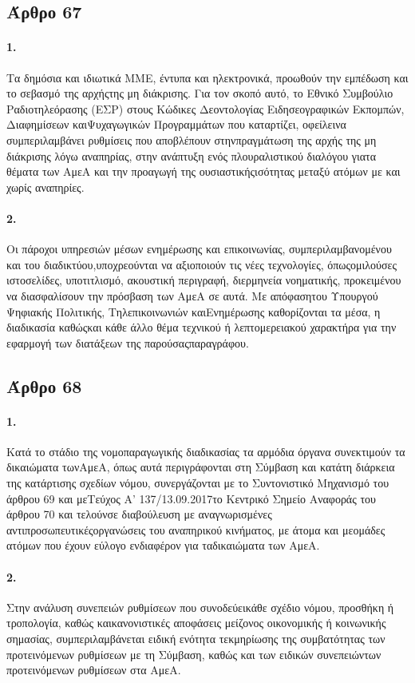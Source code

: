 \documentclass[a4paper,oneside, 10pt]{book}
\begin{document}
\subsection*{ Άρθρο 67 }
\paragraph { 1. } Τα δημόσια και ιδιωτικά ΜΜΕ, έντυπα και ηλεκτρονικά, προωθούν την εμπέδωση και το σεβασμό της αρχήςτης μη διάκρισης. Για τον σκοπό αυτό, το Εθνικό Συμβούλιο Ραδιοτηλεόρασης (ΕΣΡ) στους Κώδικες Δεοντολογίας Ειδησεογραφικών Εκπομπών, Διαφημίσεων καιΨυχαγωγικών Προγραμμάτων που καταρτίζει, οφείλεινα συμπεριλαμβάνει ρυθμίσεις που αποβλέπουν στηνπραγμάτωση της αρχής της μη διάκρισης λόγω αναπηρίας, στην ανάπτυξη ενός πλουραλιστικού διαλόγου γιατα θέματα των ΑμεΑ και την προαγωγή της ουσιαστικήςισότητας μεταξύ ατόμων με και χωρίς αναπηρίες.
\paragraph { 2. } Οι πάροχοι υπηρεσιών μέσων ενημέρωσης και επικοινωνίας, συμπεριλαμβανομένου και του διαδικτύου,υποχρεούνται να αξιοποιούν τις νέες τεχνολογίες, όπωςομιλούσες ιστοσελίδες, υποτιτλισμό, ακουστική περιγραφή, διερμηνεία νοηματικής, προκειμένου να διασφαλίσουν την πρόσβαση των ΑμεΑ σε αυτά. Με απόφασητου Υπουργού Ψηφιακής Πολιτικής, Τηλεπικοινωνιών καιΕνημέρωσης καθορίζονται τα μέσα, η διαδικασία καθώςκαι κάθε άλλο θέμα τεχνικού ή λεπτομερειακού χαρακτήρα για την εφαρμογή των διατάξεων της παρούσαςπαραγράφου.
\subsection*{ Άρθρο 68 }
\paragraph { 1. } Κατά το στάδιο της νομοπαραγωγικής διαδικασίας τα αρμόδια όργανα συνεκτιμούν τα δικαιώματα τωνΑμεΑ, όπως αυτά περιγράφονται στη Σύμβαση και κατάτη διάρκεια της κατάρτισης σχεδίων νόμου, συνεργάζονται με το Συντονιστικό Μηχανισμό του άρθρου 69 και μεΤεύχος Α’ 137/13.09.2017το Κεντρικό Σημείο Αναφοράς του άρθρου 70 και τελούνσε διαβούλευση με αναγνωρισμένες αντιπροσωπευτικέςοργανώσεις του αναπηρικού κινήματος, με άτομα και μεομάδες ατόμων που έχουν εύλογο ενδιαφέρον για ταδικαιώματα των ΑμεΑ.
\paragraph { 2. } Στην ανάλυση συνεπειών ρυθμίσεων που συνοδεύεικάθε σχέδιο νόμου, προσθήκη ή τροπολογία, καθώς καικανονιστικές αποφάσεις μείζονος οικονομικής ή κοινωνικής σημασίας, συμπεριλαμβάνεται ειδική ενότητα τεκμηρίωσης της συμβατότητας των προτεινόμενων ρυθμίσεων με τη Σύμβαση, καθώς και των ειδικών συνεπειώντων προτεινόμενων ρυθμίσεων στα ΑμεΑ.
\end{document}
